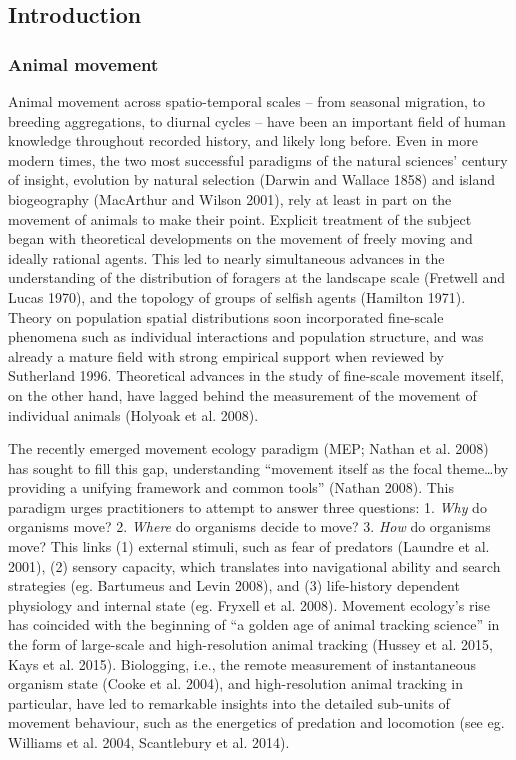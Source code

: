 \documentclass[]{scrartcl}
\begin{document}
\begin{linenumbers}
	
\part{Introduction}\label{introduction}
    \section{Animal movement}\label{animal-movement}

Animal movement across spatio-temporal scales -- from seasonal
migration, to breeding aggregations, to diurnal cycles -- have been an
important field of human knowledge throughout recorded history, and
likely long before. Even in more modern times, the two most successful
paradigms of the natural sciences' century of insight, evolution by
natural selection (Darwin and Wallace 1858) and island biogeography
(MacArthur and Wilson 2001), rely at least in part on the movement of
animals to make their point. Explicit treatment of the subject began
with theoretical developments on the movement of freely moving and
ideally rational agents. This led to nearly simultaneous advances in the
understanding of the distribution of foragers at the landscape scale
(Fretwell and Lucas 1970), and the topology of groups of selfish agents
(Hamilton 1971). Theory on population spatial distributions soon
incorporated fine-scale phenomena such as individual interactions and
population structure, and was already a mature field with strong
empirical support when reviewed by Sutherland 1996. Theoretical advances
in the study of fine-scale movement itself, on the other hand, have
lagged behind the measurement of the movement of individual animals
(Holyoak et al. 2008).

The recently emerged movement ecology paradigm (MEP; Nathan et al. 2008)
has sought to fill this gap, understanding ``movement itself as the
focal theme\ldots{}by providing a unifying framework and common tools''
(Nathan 2008). This paradigm urges practitioners to attempt to answer
three questions: 1. \emph{Why} do organisms move? 2. \emph{Where} do
organisms decide to move? 3. \emph{How} do organisms move? This links
(1) external stimuli, such as fear of predators (Laundre et al. 2001),
(2) sensory capacity, which translates into navigational ability and
search strategies (eg. Bartumeus and Levin 2008), and (3) life-history
dependent physiology and internal state (eg. Fryxell et al. 2008).
Movement ecology's rise has coincided with the beginning of ``a golden
age of animal tracking science'' in the form of large-scale and
high-resolution animal tracking (Hussey et al. 2015, Kays et al. 2015).
Biologging, i.e., the remote measurement of instantaneous organism state
(Cooke et al. 2004), and high-resolution animal tracking in particular,
have led to remarkable insights into the detailed sub-units of movement
behaviour, such as the energetics of predation and locomotion (see eg.
Williams et al. 2004, Scantlebury et al. 2014).


\end{linenumbers}
\end{document}
